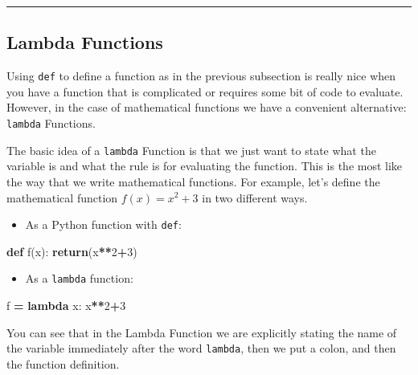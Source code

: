 \documentclass[
]{book}
\newenvironment{Shaded}{\begin{snugshade}}{\end{snugshade}}
\newcommand{\ControlFlowTok}[1]{\textcolor[rgb]{0.13,0.29,0.53}{\textbf{#1}}}
\newcommand{\DecValTok}[1]{\textcolor[rgb]{0.00,0.00,0.81}{#1}}
\newcommand{\KeywordTok}[1]{\textcolor[rgb]{0.13,0.29,0.53}{\textbf{#1}}}
\newcommand{\NormalTok}[1]{#1}
\newcommand{\OperatorTok}[1]{\textcolor[rgb]{0.81,0.36,0.00}{\textbf{#1}}}
\providecommand{\tightlist}{%
  \setlength{\itemsep}{0pt}\setlength{\parskip}{0pt}}
\theoremstyle{definition}
\theoremstyle{definition}
\theoremstyle{definition}
\theoremstyle{remark}
\begin{document}
\begin{center}\rule{0.5\linewidth}{0.5pt}\end{center}

\hypertarget{lambda-functions}{%
\subsection{Lambda Functions}\label{lambda-functions}}

Using \texttt{def} to define a function as in the previous subsection is really nice when you have a function that is complicated or requires some bit of code to evaluate. However, in the case of mathematical functions we have a convenient alternative: \texttt{lambda} Functions.

The basic idea of a \texttt{lambda} Function is that we just want to state what the variable is and what the rule is for evaluating the function. This is the most like the way that we write mathematical functions. For example, let's define the mathematical function \(f(x) = x^2+3\) in two different ways.

\begin{itemize}
\tightlist
\item
  As a Python function with \texttt{def}:
\end{itemize}

\begin{Shaded}
\begin{Highlighting}[]
\KeywordTok{def}\NormalTok{ f(x):}
    \ControlFlowTok{return}\NormalTok{(x}\OperatorTok{**}\DecValTok{2}\OperatorTok{+}\DecValTok{3}\NormalTok{)}
\end{Highlighting}
\end{Shaded}

\begin{itemize}
\tightlist
\item
  As a \texttt{lambda} function:
\end{itemize}

\begin{Shaded}
\begin{Highlighting}[]
\NormalTok{f }\OperatorTok{=} \KeywordTok{lambda}\NormalTok{ x: x}\OperatorTok{**}\DecValTok{2}\OperatorTok{+}\DecValTok{3}
\end{Highlighting}
\end{Shaded}

You can see that in the Lambda Function we are explicitly stating the name of the variable immediately after the word \texttt{lambda}, then we put a colon, and then the function definition.
\end{document}
